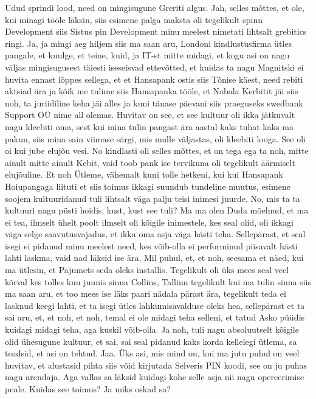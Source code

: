Udud sprindi lood, need on mingisugune Greriti algus.
Jah, selles mõttes, et ole, kui minagi tööle läksin, siis esimene palga maksta oli tegelikult spinn Development siis Sistus pin Development minu meelest nimetati lihtsalt grebitics ringi. Ja, ja mingi aeg hiljem siis ma saan aru, Londoni kindlustusfirma ütles pangale, et kuulge, et teine, kuid, ja IT-st mitte midagi, et kogu asi on nagu väljas mingisugusest täiesti iseseisvad ettevõtted, et kuidas ta nagu Magnitski ei huvita ennast lõppes sellega, et et Hansapank ostis siis Tõnise käest, need rebiti aktsiad ära ja kõik me tulime siis Hansapanka tööle, et Nabala Kerbitit jäi siis noh, ta juriidiline keha jäi alles ja kuni tänase päevani siis praeguseks swedbank Support OÜ nime all olemas.
Huvitav on see, et see kultuur oli ikka jätkuvalt nagu kleebiti oma, sest kui mina tulin pangast ära aastal kaks tuhat kaks ma pakun, siis mina sain viimase särgi, mis mulle väljastas, oli kleebiti looga. See oli oi kui jube elujõu vesi.
No kindlasti oli selles mõttes, et on tega ega ta noh, mitte ainult mitte ainult Kebit, vaid toob pank ise tervikuna oli tegelikult äärmiselt elujõuline.
Et noh
Ütleme, vähemalt kuni tolle hetkeni, kui kui Hansapank Hoiupangaga liituti et siis toimus ikkagi suundub tundeline muutus, esimene soojem kultuuridanud tuli lihtsalt väga palju teisi inimesi juurde.
No, mis ta ta kultuuri nagu püsti hoidis, kust, kust see tuli?
Ma ma olen Duda mõelnud, et ma ei tea, ilmselt ühelt poolt ilmselt oli kõigile inimestele, kes seal olid, oli ikkagi väga selge saavutusvajadus, et ikka oma asja väga hästi teha. Sellepärast, et seal isegi ei pidanud minu meelest need, kes võib-olla ei performinud piisavalt hästi lahti laskma, vaid nad läksid ise ära. Mil puhul, et, et noh, seesama et näed, kui ma ütlesin, et Pajumets seda oleks installis. Tegelikult oli üks mees seal veel kõrval kes tolles kuu juunis sinna Collins, Tallinn tegelikult kui ma tulin sinna siis ma saan aru, et too mees ise läks paari nädala pärast ära, tegelikult teda ei lasknud keegi lahti, et ta isegi ütles lahkumisavalduse oleks hea, sellepärast et ta sai aru, et, et noh, et noh, temal ei ole midagi teha selleni, et tatud Asko püüdis kuidagi midagi teha, aga kuskil võib-olla. Ja noh, tuli nagu absoluutselt kõigile olid ühesugune kultuur, et sai, sai seal pidanud kaks korda kellelegi ütlema, sa teadsid, et asi on tehtud.
Jaa. Üks asi, mis mind on, kui ma jutu puhul on veel huvitav, et alustasid pihta siis võid kirjutada Selveris PIN koodi, see on ju puhas nagu arendaja. Aga vallas sa läksid kuidagi kohe selle asja nii nagu opereerimise peale. Kuidas see toimus? Ja miks oskad sa?
